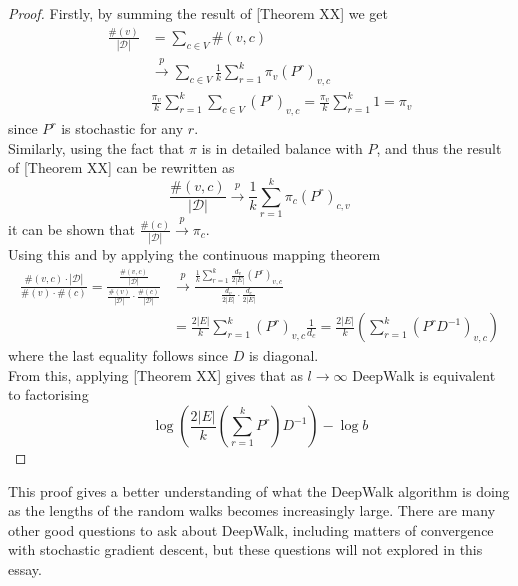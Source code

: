 \documentclass[a4paper]{article}
\newcommand{\D}{\mathcal D}
\begin{document}
\begin{proof}
  Firstly, by summing the result of [Theorem XX] we get
  \begin{align*}
    \frac{\#(v)}{|\D|} &= \sum_{c \in V}\#(v, c)\\
                       &\overset{p}{\longrightarrow} \sum_{c \in V} \frac{1}{k}\sum_{r=1}^k \pi_v(P^r)_{v, c}\\
                       &\frac{\pi_v}{k}\sum_{r = 1}^k \sum_{c \in V}(P^r)_{v,c} = \frac{\pi_v}{k}\sum_{r = 1}^k 1 = \pi_v
  \end{align*}
  since $P^r$ is stochastic for any $r$.\\
  Similarly, using the fact that $\pi$ is in detailed balance with $P$, and thus
  the result of [Theorem XX] can be rewritten as
  \[\frac{\#(v, c)}{|\D|} \overset{p}{\longrightarrow} \frac{1}{k} \sum_{r = 1}^k \pi_c
    (P^r)_{c,v}\]
  it can be shown that $\frac{\#(c)}{|\D|} \overset{p}{\longrightarrow} \pi_c$.\\
  Using this and by applying the continuous mapping theorem
  \begin{align*}
    \frac{\#(v, c) \cdot |\D|}{\#(v) \cdot \#(c)} = \frac{\frac{\#(v,c)}{|\D|}}{\frac{\#(v)}{|\D|} \cdot \frac{\#(c)}{|\D|}} & \overset{p}{\longrightarrow} \frac{\frac{1}{k}\sum_{r=1}^{k} \frac{d_v}{2|E|}(P^r)_{v, c}}{\frac{d_v}{2|E|} \cdot \frac{d_c}{2|E|}}\\
                                                                                                                             &=\frac{2|E|}{k}\sum_{r=1}^k (P^r)_{v,c} \frac{1}{d_c} = \frac{2|E|}{k}\left( \sum_{r=1}^k(P^rD^{-1})_{v,c} \right)
  \end{align*}
  where the last equality follows since $D$ is diagonal.\\
  From this, applying [Theorem XX] gives that as $l \to \infty$ DeepWalk is equivalent to
  factorising
  \[\log \left( \frac{2|E|}{k}\left( \sum_{r=1}^k P^r \right)D^{-1}\right) - \log{b}\]
\end{proof}
\noindent This proof gives a better understanding of what the DeepWalk algorithm is doing as the lengths of the random walks becomes increasingly large.
There are many other good questions to ask about DeepWalk, including matters of convergence with stochastic gradient descent, but
these questions will not explored in this essay.
\end{document}
